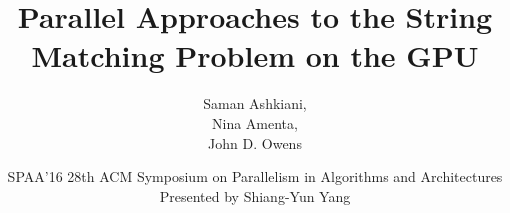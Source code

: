 \documentclass{beamer}
\title{Parallel Approaches to the String Matching Problem on the GPU}
\author{
    Saman Ashkiani\inst{1},\\
    Nina Amenta\inst{1},\\
    John D. Owens\inst{1}
}
\institute{
    \inst{1} University of California, Davis
}
\date{
    \tiny{SPAA'16 28th ACM Symposium on Parallelism in Algorithms and Architectures}\\
    \tiny{Presented by Shiang-Yun Yang}
}
\begin{document}
\begin{frame}
    \titlepage
\end{frame}







\end{document}
